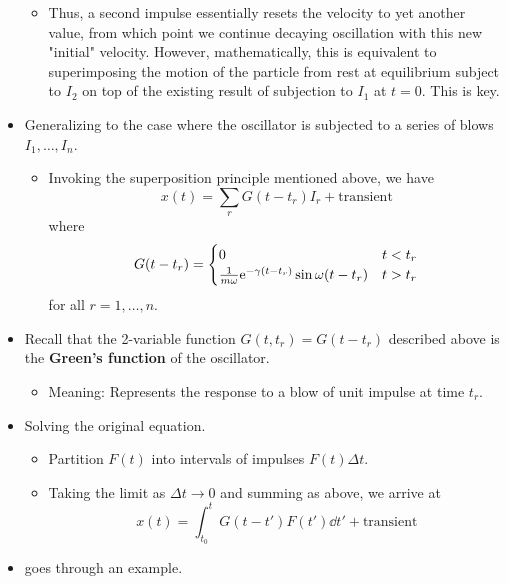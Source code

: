 \documentclass[../notes.tex]{subfiles}
\begin{document}
\begin{itemize}
\begin{itemize}
        \item Thus, a second impulse essentially resets the velocity to yet another value, from which point we continue decaying oscillation with this new "initial" velocity. However, mathematically, this is equivalent to superimposing the motion of the particle from rest at equilibrium subject to $I_2$ on top of the existing result of subjection to $I_1$ at $t=0$. This is key.
    \end{itemize}
    \item Generalizing to the case where the oscillator is subjected to a series of blows $I_1,\dots,I_n$.
    \begin{itemize}
        \item Invoking the superposition principle mentioned above, we have
        \begin{equation*}
            x(t) = \sum_rG(t-t_r)I_r+\text{transient}
        \end{equation*}
        where
        \begin{equation*}
            G(t-t_r) =
            \begin{cases}
                0 & t<t_r\\
                \frac{1}{m\omega}\e[-\gamma(t-t_r)]\sin\omega(t-t_r) & t>t_r
            \end{cases}
        \end{equation*}
        for all $r=1,\dots,n$.
    \end{itemize}
    \item Recall that the 2-variable function $G(t,t_r)=G(t-t_r)$ described above is the \textbf{Green's function} of the oscillator.
    \begin{itemize}
        \item Meaning: Represents the response to a blow of unit impulse at time $t_r$.
    \end{itemize}
    \item Solving the original equation.
    \begin{itemize}
        \item Partition $F(t)$ into intervals of impulses $F(t)\Delta t$.
        \item Taking the limit as $\Delta t\to 0$ and summing as above, we arrive at
        \begin{equation*}
            x(t) = \int_{t_0}^tG(t-t')F(t')\dd{t'}+\text{transient}
        \end{equation*}
    \end{itemize}
    \item \textcite{bib:KibbleBerkshire} goes through an example.
\end{itemize}
\end{document}

